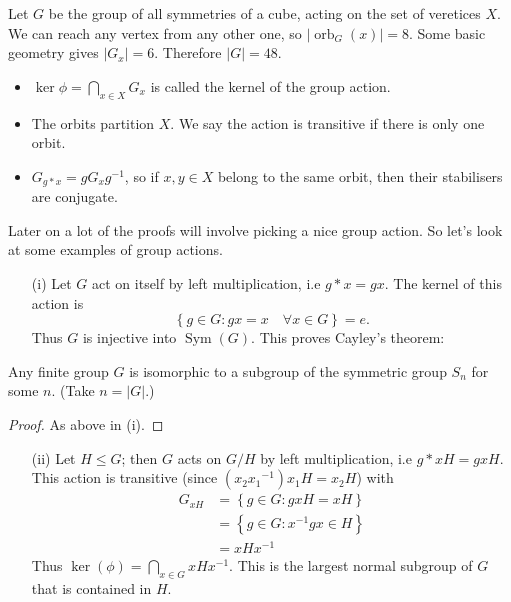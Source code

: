 \documentclass[egregdoesnotlikesansseriftitles,a4paper]{scrartcl}
\begin{document}
\begin{example*}
      Let $G$ be the group of all symmetries of a cube, acting on the set of veretices $X$. We can reach any vertex from any other one, so $|\operatorname{orb}_G (x)|=8$. Some basic geometry gives $|G_{x}|=6$. Therefore $|G|=48$.
\end{example*} 
\begin{remark}
      \begin{itemize}
           \item $\operatorname{ker} \phi=\bigcap_{x \in X}G_{x}$ is called the kernel of the group action. 
           \item The orbits partition $X$. We say the action is transitive if there is only one orbit.
           \item $G_{g \ast x}=g G_{x} {g}^{-1}$, so if $x,y \in X$ belong to the same orbit, then their stabilisers are conjugate.
      \end{itemize}
\end{remark}
Later on a lot of the proofs will involve picking a nice group action. So let's look at some examples of group actions. 
\begin{itemize}
     \item[(i)] Let $G$ act on itself by left multiplication, i.e $g \ast x =gx$. The kernel of this action is \[
     \left\{g \in G: gx=x \quad \forall x \in G\right\}=e
     .\] Thus $G $ is injective into $\operatorname{Sym}(G)$. This proves Cayley's theorem:
 \end{itemize}
 \begin{theorem}
     Any finite group $G$ is isomorphic to a subgroup of the symmetric group $S_{n}$ for some $n$. (Take $n=|G|$.)
     \begin{proof}
      As above in (i).
      \end{proof}
 \end{theorem}
 \begin{itemize}
      \item[(ii)] Let $H \leq G$; then $G$ acts on $G/H$ by left multiplication, i.e $g \ast x H= gxH$. This action is transitive (since $(x_2 {x_1 }^{-1})x_1 H=x_2 H$) with 
      \begin{align*}
          G_{xH}&=\left\{g \in G: gxH=xH\right\}\\&=\left\{g \in G: {x}^{-1}gx \in H\right\}\\&=xH {x}^{-1} 
      \end{align*} Thus $\operatorname{ker}(\phi)=\bigcap_{x \in G}xH {x}^{-1}$. This is the largest normal subgroup of $G$ that is contained in $H$.  
 \end{itemize}
\end{document}
